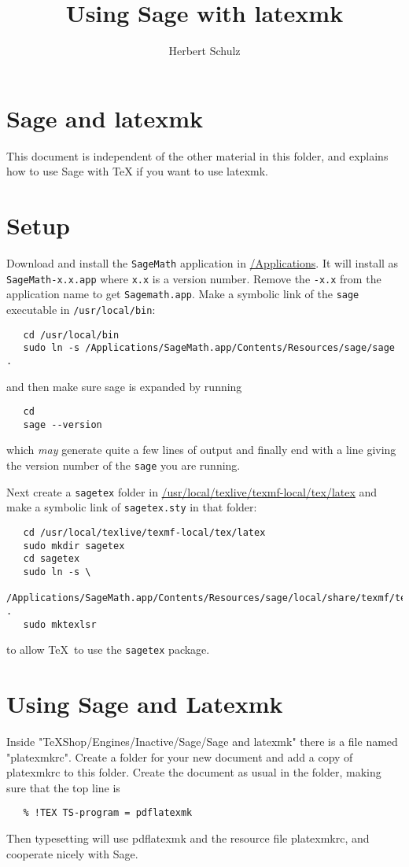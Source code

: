 \documentclass[11pt, oneside]{amsart}
\title{Using Sage with latexmk}
\author{Herbert Schulz}
\begin{document}
\maketitle

\section{Sage and latexmk}

This document is independent of the other material in this folder, and explains how to use Sage with TeX if you want to use latexmk.

\section{Setup}

Download and install the \texttt{SageMath} application in \url{/Applications}. It will install as \texttt{SageMath-x.x.app} where \texttt{x.x} is a version number. Remove the \texttt{-x.x} from the application name to get \texttt{Sagemath.app}. Make a symbolic link of the \texttt{sage} executable in \texttt{/usr/local/bin}:
{\small\begin{verbatim}
   cd /usr/local/bin
   sudo ln -s /Applications/SageMath.app/Contents/Resources/sage/sage .
\end{verbatim}
}
and then make sure sage is expanded by running
{\small\begin{verbatim}
   cd
   sage --version
\end{verbatim}
}
which \emph{may} generate quite a few lines of output and finally end with a line giving the version number of the \texttt{sage} you are running.

Next create a \texttt{sagetex} folder in \url{/usr/local/texlive/texmf-local/tex/latex} and make a symbolic link of \texttt{sagetex.sty} in that folder:
{\small\begin{verbatim}
   cd /usr/local/texlive/texmf-local/tex/latex
   sudo mkdir sagetex
   cd sagetex
   sudo ln -s \
     /Applications/SageMath.app/Contents/Resources/sage/local/share/texmf/tex/latex/sagetex.sty .
   sudo mktexlsr
\end{verbatim}
}
to allow \TeX\ to use the \texttt{sagetex} package.
\newpage
\section{Using Sage and Latexmk}

Inside "TeXShop/Engines/Inactive/Sage/Sage and latexmk" there is a file named "platexmkrc". Create a folder for your new document and add a copy of platexmkrc  to this folder. Create the document as usual in the folder, making sure that the top line is
\begin{verbatim}
   % !TEX TS-program = pdflatexmk
\end{verbatim}
Then typesetting will use pdflatexmk and the resource file platexmkrc, and cooperate nicely with Sage.
\end{document}
